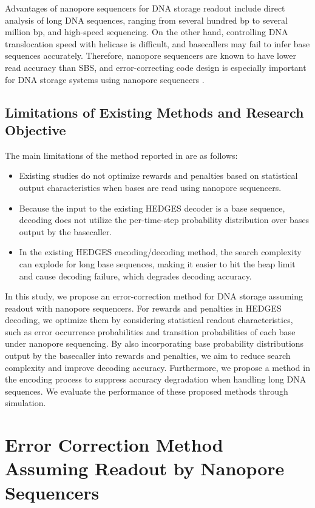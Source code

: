 \documentclass[sotsuron]{kuee}
\begin{document}
Advantages of nanopore sequencers for DNA storage readout include direct
analysis of long DNA sequences, ranging from several hundred bp to several
million bp, and high-speed sequencing.
On the other hand, controlling DNA translocation speed with helicase is
difficult, and basecallers may fail to infer base sequences accurately.
Therefore, nanopore sequencers are known to have lower read accuracy than SBS,
and error-correcting code design is especially important for DNA storage systems
using nanopore sequencers \cite{Amarasinghe2020,Dorey2024}.

\section{Limitations of Existing Methods and Research Objective} \label{sec:problem}
The main limitations of the method reported in \cite{HEDGES} are as follows:
\begin{itemize}
  \item Existing studies do not optimize rewards and penalties based on
  statistical output characteristics when bases are read using nanopore
  sequencers.
  \item Because the input to the existing HEDGES decoder is a base sequence,
  decoding does not utilize the per-time-step probability distribution over
  bases output by the basecaller.
  \item In the existing HEDGES encoding/decoding method, the search complexity
  can explode for long base sequences, making it easier to hit the heap limit
  and cause decoding failure, which degrades decoding accuracy.
\end{itemize}
In this study, we propose an error-correction method for DNA storage assuming
readout with nanopore sequencers.
For rewards and penalties in HEDGES decoding, we optimize them by considering
statistical readout characteristics, such as error occurrence probabilities and
transition probabilities of each base under nanopore sequencing.
By also incorporating base probability distributions output by the basecaller
into rewards and penalties, we aim to reduce search complexity and improve
decoding accuracy.
Furthermore, we propose a method in the encoding process to suppress accuracy
degradation when handling long DNA sequences.
We evaluate the performance of these proposed methods through simulation.

\chapter{Error Correction Method Assuming Readout by Nanopore Sequencers}\label{proposed_method}
\end{document}
